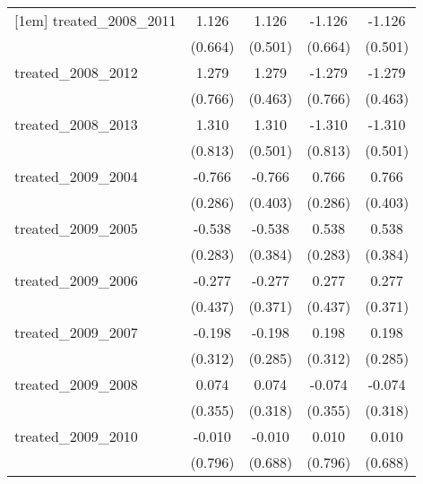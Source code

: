 {\begin{tabular}{l*{4}{c}}
[1em]
treated\_2008\_2011&       1.126         &       1.126\sym{*}  &      -1.126         &      -1.126\sym{*}  \\
            &     (0.664)         &     (0.501)         &     (0.664)         &     (0.501)         \\
[1em]
treated\_2008\_2012&       1.279         &       1.279\sym{**} &      -1.279         &      -1.279\sym{**} \\
            &     (0.766)         &     (0.463)         &     (0.766)         &     (0.463)         \\
[1em]
treated\_2008\_2013&       1.310         &       1.310\sym{**} &      -1.310         &      -1.310\sym{**} \\
            &     (0.813)         &     (0.501)         &     (0.813)         &     (0.501)         \\
[1em]
treated\_2009\_2004&      -0.766\sym{**} &      -0.766         &       0.766\sym{**} &       0.766         \\
            &     (0.286)         &     (0.403)         &     (0.286)         &     (0.403)         \\
[1em]
treated\_2009\_2005&      -0.538         &      -0.538         &       0.538         &       0.538         \\
            &     (0.283)         &     (0.384)         &     (0.283)         &     (0.384)         \\
[1em]
treated\_2009\_2006&      -0.277         &      -0.277         &       0.277         &       0.277         \\
            &     (0.437)         &     (0.371)         &     (0.437)         &     (0.371)         \\
[1em]
treated\_2009\_2007&      -0.198         &      -0.198         &       0.198         &       0.198         \\
            &     (0.312)         &     (0.285)         &     (0.312)         &     (0.285)         \\
[1em]
treated\_2009\_2008&       0.074         &       0.074         &      -0.074         &      -0.074         \\
            &     (0.355)         &     (0.318)         &     (0.355)         &     (0.318)         \\
[1em]
treated\_2009\_2010&      -0.010         &      -0.010         &       0.010         &       0.010         \\
            &     (0.796)         &     (0.688)         &     (0.796)         &     (0.688)         \\

\end{tabular}}

